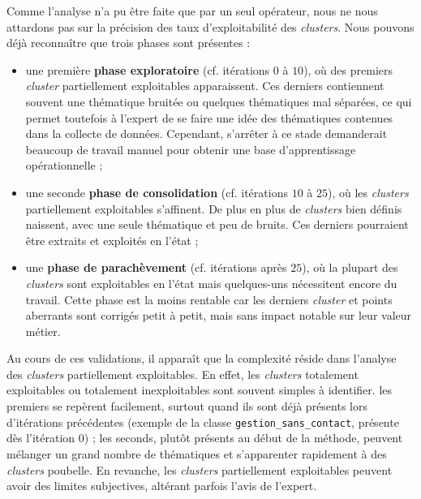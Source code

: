 			Comme l'analyse n'a pu être faite que par un seul opérateur, nous ne nous attardons pas sur la précision des taux d'exploitabilité des \textit{clusters}.
			Nous pouvons déjà reconnaître que trois phases sont présentes :
			\begin{itemize}
				\item une première \textbf{phase exploratoire} (cf. itérations $0$ à $10$), où des premiers \textit{cluster} partiellement exploitables apparaissent.
				Ces derniers contiennent souvent une thématique bruitée ou quelques thématiques mal séparées, ce qui permet toutefois à l'expert de se faire une idée des thématiques contenues dans la collecte de données.
				Cependant, s'arrêter à ce stade demanderait beaucoup de travail manuel pour obtenir une base d'apprentissage opérationnelle ;
				\item une seconde \textbf{phase de consolidation} (cf. itérations $10$ à $25$), où les \textit{clusters} partiellement exploitables s'affinent.
				De plus en plus de \textit{clusters} bien définis naissent, avec une seule thématique et peu de bruits.
				Ces derniers pourraient être extraits et exploités en l'état ;
				\item une \textbf{phase de parachèvement} (cf. itérations après $25$), où la plupart des \textit{clusters} sont exploitables en l'état mais quelques-uns nécessitent encore du travail.
				Cette phase est la moins rentable car les derniers \textit{cluster} et points aberrants sont corrigés petit à petit, mais sans impact notable sur leur valeur métier. 
			\end{itemize}
			
			Au cours de ces validations, il apparaît que la complexité réside dans l'analyse des \textit{clusters} partiellement exploitables.
			En effet, les \textit{clusters} totalement exploitables ou totalement inexploitables sont souvent simples à identifier.
			les premiers se repèrent facilement, surtout quand ils sont déjà présents lors d'itérations précédentes (exemple de la classe \texttt{gestion\_sans\_contact}, présente dès l'itération $0$) ;
			les seconds, plutôt présents au début de la méthode, peuvent mélanger un grand nombre de thématiques et s'apparenter rapidement à des \textit{clusters} poubelle.
			En revanche, les \textit{clusters} partiellement exploitables peuvent avoir des limites subjectives, altérant parfois l'avis de l'expert.
			
